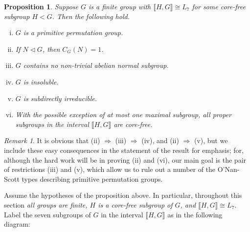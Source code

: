 \documentclass{gen-j-l}
\newcommand{\lb}{\ensuremath{\llbracket}}
\newcommand{\rb}{\ensuremath{\rrbracket}}
\newcommand{\<}{\ensuremath{\langle}}
\renewcommand{\>}{\ensuremath{\rangle}}
\theoremstyle{plain}
\newtheorem{prop}[theorem]{Proposition}
\theoremstyle{definition}
\theoremstyle{remark}
\newtheorem*{remark}{Remark}
\numberwithin{theorem}{section}
\numberwithin{claim}{section}
\numberwithin{equation}{section}
\numberwithin{conjecture}{section}
\newcommand{\ssubnormal}{\ensuremath{\vartriangleleft}}
\newcommand{\2}{\ensuremath{\mathbf{2}}}
\newcommand{\3}{\ensuremath{\mathbf{3}}}
\begin{document}
\begin{prop}
\label{thm:except-seven-elem}
Suppose $G$ is a finite group with $\lb H,G \rb\cong L_7$ for some core-free subgroup $H<G$.  Then the following hold.
\begin{enumerate}[(i)]
\item $G$ is a primitive permutation group.
\item If $N\ssubnormal G$, then $C_G(N) = 1$.
\item $G$ contains no non-trivial abelian normal subgroup.
\item $G$ is insoluble.
\item $G$ is subdirectly irreducible.
\item With the possible exception of at most one maximal subgroup,
  all proper subgroups in the interval $\lb H,G \rb$ are core-free. 

\end{enumerate}
\end{prop}
\begin{remark}
  It is obvious that (ii) $\Rightarrow$ (iii) $\Rightarrow$ (iv), and  (ii) $\Rightarrow$
  (v), but we include these easy consequences in the statement of the result for
  emphasis; for, although the hard work will be in proving (ii) and (vi), our
  main goal is the pair of restrictions (iii) and (v), which allow us to rule
  out a number of the O'Nan-Scott types describing primitive permutation
  groups.  
\end{remark}

Assume the hypotheses of the proposition above.  In particular, throughout this
section \emph{all groups are finite, $H$ is a core-free subgroup of $G$, and $\lb H,G \rb \cong
  L_7$}. Label the seven subgroups of $G$ in
the interval $\lb H,G \rb$ as in the following diagram:

\begin{center}
  {

  }
\end{center}
\end{document}
